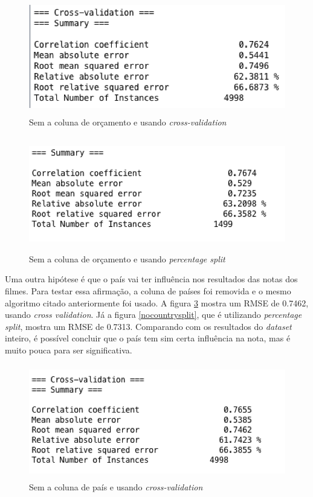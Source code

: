 \begin{figure}[H]
\centering
\includegraphics[height=5cm]{imagens/no_budget_cv.png}
\caption{Sem a coluna de orçamento e usando \textit{cross-validation}}
\label{nobudgetcv}
\end{figure}

\begin{figure}[H]
\centering
\includegraphics[height=5cm]{imagens/no_budget_split.png}
\caption{Sem a coluna de orçamento e usando \textit{percentage split}}
\label{nobudgetsplit}
\end{figure}


Uma outra hipótese é que o país vai ter influência nos resultados das notas dos filmes. Para testar essa afirmação, a coluna de países foi removida e o mesmo algoritmo citado anteriormente foi usado. A figura \ref{nocountrycv} mostra um RMSE de 0.7462, usando \textit{cross validation}. Já a figura \ref{nocountrysplit}, que é utilizando \textit{percentage split}, mostra um RMSE de 0.7313. Comparando com os resultados do \textit{dataset} inteiro, é possível concluir que o país tem sim certa influência na nota, mas é muito pouca para ser significativa. 

\begin{figure}[H]
\centering
\includegraphics[height=5cm]{imagens/no_country_cv.png}
\caption{Sem a coluna de país e usando \textit{cross-validation}}
\label{nocountrycv}
\end{figure}

